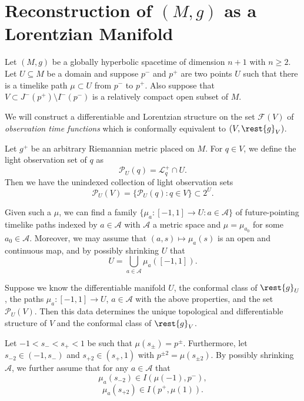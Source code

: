 \def\t{\frak{t}}
\def\reg{\text{reg}}

\section{Reconstruction of $(M,g)$ as a Lorentzian Manifold}


Let $(M,g)$ be a globally hyperbolic spacetime of dimension $n+1$ with $n\geq 2$.  Let $U\subseteq M$ be a domain and suppose $p^-$ and $p^+$ are two points $U$ such that there is a timelike path $\mu\subset U$ from $p^-$ to $p^+$.  Also suppose that $V\subset J^-(p^+)\setminus I^-(p^-)$ is a relatively compact open subset of $M$. 



We will construct a differentiable and Lorentzian structure on the set $\mathcal{F}(V)$ of \textit{observation time functions} which is conformally equivalent to $(V,\rest{g}_V)$.

Let $g^+$ be an arbitrary Riemannian metric placed on $M$.  For $q\in V$, we define the light observation set of $q$ as
$$\mathcal{P}_U(q)=\mathcal{L}_q^+\cap U.$$
Then we have the unindexed collection of light observation sets
$$\mathcal{P}_U(V)=\{\mathcal{P}_U(q):q\in V\}\subset 2^U.$$

Given such a $\mu$, we can find a family $\{\mu_a:[-1,1]\to U:a\in\mathcal{A}\}$ of future-pointing timelike paths indexed by $a\in\mathcal{A}$ with $\mathcal{A}$ a metric space and $\mu=\mu_{a_0}$ for some $a_0\in\mathcal{A}$.  Moreover, we may assume that $(a,s)\mapsto\mu_a(s)$ is an open and continuous map, and by possibly shrinking $U$ that
$$U=\bigcup_{a\in\mathcal{A}}\mu_a([-1,1]).$$

\begin{thm}
    Suppose we know the differentiable manifold $U$, the conformal class of $\rest{g}_U$, the paths $\mu_a:[-1,1]\to U$, $a\in\mathcal{A}$ with the above properties, and the set $\mathcal{P}_U(V)$.  Then this data determines the unique topological and differentiable structure of $V$ and the conformal class of $\rest{g}_V$.
\end{thm}

Let $-1<s_-<s_+<1$ be such that $\mu(s_\pm)=p^\pm$.  Furthermore, let $s_{-2}\in(-1,s_-)$ and $s_{+2}\in(s_+,1)$ with $p^{\pm2}=\mu(s_{\pm2})$.  By possibly shrinking $\mathcal{A}$, we further assume that for any $a\in\mathcal{A}$ that
$$\mu_a(s_{-2})\in I(\mu(-1),p^-),$$
$$\mu_a(s_{+2})\in I(p^+,\mu(1)).$$


